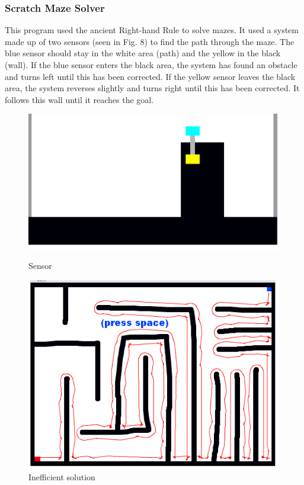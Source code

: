 \documentclass[titlepage]{article}
\begin{document}
\subsubsection{Scratch Maze Solver}
This program used the ancient Right-hand Rule to solve mazes. It used a system made up of two sensors (seen in Fig. 8) to find the path through the maze. The blue sensor should stay in the white area (path) and the yellow in the black (wall). If the blue sensor enters the black area, the system has found an obstacle and turns left until this has been corrected. If the yellow sensor leaves the black area, the system reverses slightly and turns right until this has been corrected. It follows this wall until it reaches the goal.
\begin{figure}[!htb]
  \includegraphics[width=\linewidth]{Sensors.PNG}
  \caption{Sensor}\label{fig:sensor}
\endminipage\hfill
{}
  \includegraphics[width=\linewidth]{Inefficient.png}
  \caption{Inefficient solution}\label{fig:inefficient}
\endminipage\hfill
\end{figure}
\end{document}
